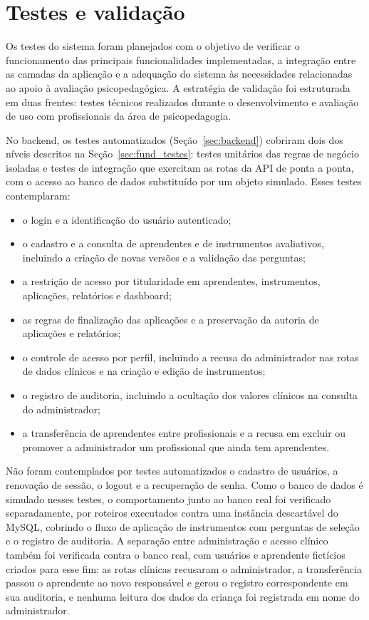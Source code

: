 \section{Testes e validação}\label{sec:testes-validacao}

Os testes do sistema foram planejados com o objetivo de verificar o funcionamento das principais funcionalidades implementadas, a integração entre as camadas da aplicação e a adequação do sistema às necessidades relacionadas ao apoio à avaliação psicopedagógica. A estratégia de validação foi estruturada em duas frentes: testes técnicos realizados durante o desenvolvimento e avaliação de uso com profissionais da área de psicopedagogia.

No backend, os testes automatizados (Seção~\ref{sec:backend}) cobriram dois dos níveis descritos na Seção~\ref{sec:fund_testes}: testes unitários das regras de negócio isoladas e testes de integração que exercitam as rotas da API de ponta a ponta, com o acesso ao banco de dados substituído por um objeto simulado. Esses testes contemplaram:

\begin{itemize}
    \item o login e a identificação do usuário autenticado;
    \item o cadastro e a consulta de aprendentes e de instrumentos avaliativos, incluindo a criação de novas versões e a validação das perguntas;
    \item a restrição de acesso por titularidade em aprendentes, instrumentos, aplicações, relatórios e dashboard;
    \item as regras de finalização das aplicações e a preservação da autoria de aplicações e relatórios;
    \item o controle de acesso por perfil, incluindo a recusa do administrador nas rotas de dados clínicos e na criação e edição de instrumentos;
    \item o registro de auditoria, incluindo a ocultação dos valores clínicos na consulta do administrador;
    \item a transferência de aprendentes entre profissionais e a recusa em excluir ou promover a administrador um profissional que ainda tem aprendentes.
\end{itemize}

Não foram contemplados por testes automatizados o cadastro de usuários, a renovação de sessão, o logout e a recuperação de senha. Como o banco de dados é simulado nesses testes, o comportamento junto ao banco real foi verificado separadamente, por roteiros executados contra uma instância descartável do MySQL, cobrindo o fluxo de aplicação de instrumentos com perguntas de seleção e o registro de auditoria. A separação entre administração e acesso clínico também foi verificada contra o banco real, com usuários e aprendente fictícios criados para esse fim: as rotas clínicas recusaram o administrador, a transferência passou o aprendente ao novo responsável e gerou o registro correspondente em sua auditoria, e nenhuma leitura dos dados da criança foi registrada em nome do administrador.

